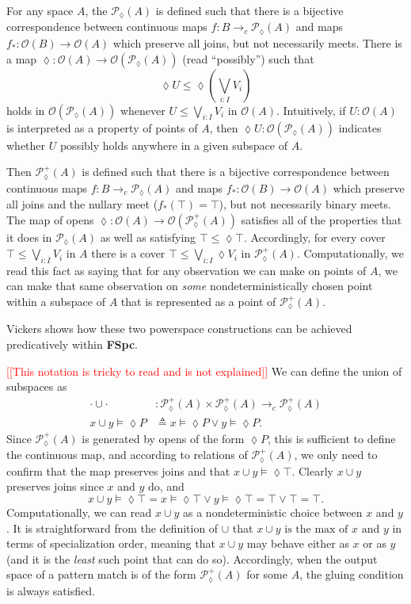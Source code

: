 \documentclass[conference]{IEEEtran}
\newcommand{\PLower}{\mathcal{P}_\lozenge}
\newcommand{\cto}{\to_c}
\newcommand{\Open}[1]{\mathcal{O}({#1})}
\newcommand{\note}[1]{\textcolor{red}{[[{#1}]]}}
\newcommand{\isthemaxof}[3]{{#1}\text{ is the max of }{#2}\text{ and }{#3}}
\begin{document}
For any space $A$, the $\PLower(A)$ is defined such that there is a bijective correspondence between continuous maps $f : B \cto \PLower(A)$ and maps $f_* : \Open{B} \to \Open{A}$ which preserve all joins, but not necessarily meets. There is a map $\lozenge : \Open{A} \to \Open{\PLower(A)}$ (read ``possibly'') such that
\[
\lozenge U \le \lozenge \left( \bigvee_{i : I} V_i \right)
\]
holds in $\Open{\PLower(A)}$ whenever $U \le \bigvee_{i : I} V_i$ in $\Open{A}$. Intuitively, if $U : \Open{A}$ is interpreted as a property of points of $A$, then $\lozenge U : \Open{\PLower(A)}$ indicates whether $U$ possibly holds anywhere in a given subspace of $A$.

Then $\PLower^+(A)$ is defined such that there is a bijective correspondence between continuous maps $f : B \cto \PLower(A)$ and maps $f_* : \Open{B} \to \Open{A}$ which preserve all joins and the nullary meet ($f_*(\top) = \top$), but not necessarily binary meets. The map of opens $\lozenge : \Open{A} \to \Open{\PLower^+(A)}$ satisfies all of the properties that it does in $\PLower(A)$ as well as satisfying
$\top \le \lozenge \top$. Accordingly, for every cover $\top \le \bigvee_{i : I} V_i$ in $A$ there is a cover $\top \le \bigvee_{i : I} \lozenge V_i$ in $\PLower^+(A)$. Computationally, we read this fact as saying that for any observation we can make on points of $A$, we can make that same observation on \emph{some} nondeterministically chosen point within a subspace of $A$ that is represented as a point of $\PLower^+(A)$.

Vickers \cite{vickersdoublepowerlocale} shows how these two powerspace constructions can be achieved predicatively within \textbf{FSpc}. 

\note{This notation is tricky to read and is not explained} We can define the union of subspaces as
\begin{align*}
\cdot \cup \cdot &: \PLower^+(A) \times \PLower^+(A) \cto \PLower^+(A)
\\ x \cup y \models \lozenge P &\triangleq x \models \lozenge P \vee y \models \lozenge P.
\end{align*}
Since $\PLower^+(A)$ is generated by opens of the form $\lozenge P$, this is sufficient to define the continuous map, and according to relations of $\PLower^+(A)$, we only need to confirm that the map preserves joins and that $x \cup y \models \lozenge \top$. Clearly $x \cup y$ preserves joins since $x$ and $y$ do, and 
\[
x \cup y \models \lozenge \top = x \models \lozenge \top \vee y \models \lozenge \top = \top \vee \top = \top.
\]
Computationally, we can read $x \cup y$ as a nondeterministic choice between $x$ and $y$.
It is straightforward from the definition of $\cup$ that $\isthemaxof{x \cup y}{x}{y}$ in terms of specialization order, meaning that $x \cup y$ may behave either as $x$ or as $y$ (and it is the \emph{least} such point that can do so). Accordingly, when the output space of a pattern match is of the form $\PLower^+(A)$ for some $A$, the gluing condition is always satisfied.
\end{document}
